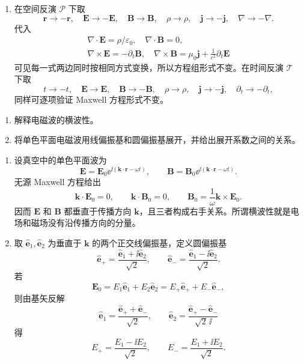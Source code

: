 \begin{question}
\begin{solution}
\begin{enumerate}
  \item 在空间反演 $\mathcal P$ 下取
  \[
    \mathbf r\to-\mathbf r,\quad
    \mathbf E\to-\mathbf E,
    \quad \mathbf B\to\mathbf B,
    \quad \rho\to\rho,
    \quad \mathbf j\to-\mathbf j,
    \quad \nabla\to-\nabla .
  \]
  代入
  \[
  \begin{gathered}
    \nabla\cdot\mathbf E=\rho/\varepsilon_0,
    \quad \nabla\cdot\mathbf B=0,\\
    \nabla\times\mathbf E=-\partial_t\mathbf B,
    \quad \nabla\times\mathbf B=\mu_0\mathbf j+\frac{1}{c^2}\partial_t\mathbf E
  \end{gathered}
  \]
  可见每一式两边同时按相同方式变换，所以方程组形式不变。在时间反演 $\mathcal T$ 下取
  \[
    t\to-t,
    \quad \mathbf E\to\mathbf E,
    \quad \mathbf B\to-\mathbf B,
    \quad \rho\to\rho,
    \quad \mathbf j\to-\mathbf j,
    \quad \partial_t\to-\partial_t,
  \]
  同样可逐项验证 Maxwell 方程形式不变。
\end{enumerate}
\end{solution}
\end{question}

\begin{question}[电磁波的横波性与偏振基]
\begin{enumerate}
  \item 解释电磁波的横波性。
  \item 将单色平面电磁波用线偏振基和圆偏振基展开，并给出展开系数之间的关系。
\end{enumerate}
\begin{solution}
\begin{enumerate}
  \item 设真空中的单色平面波为
  \[
    \mathbf E=\mathbf E_0\ee^{\ii(\mathbf k\cdot\mathbf r-\omega t)},
    \qquad
    \mathbf B=\mathbf B_0\ee^{\ii(\mathbf k\cdot\mathbf r-\omega t)} .
  \]
  无源 Maxwell 方程给出
  \[
    \mathbf k\cdot\mathbf E_0=0,
    \qquad
    \mathbf k\cdot\mathbf B_0=0,
    \qquad
    \mathbf B_0=\frac{1}{\omega}\mathbf k\times\mathbf E_0 .
  \]
  因而 $\mathbf E$ 和 $\mathbf B$ 都垂直于传播方向 $\mathbf k$，且三者构成右手关系。所谓横波性就是电场和磁场没有沿传播方向的分量。

  \item 取 $\hat{\mathbf e}_1,\hat{\mathbf e}_2$ 为垂直于 $\mathbf k$ 的两个正交线偏振基，定义圆偏振基
  \[
    \hat{\mathbf e}_+=\frac{\hat{\mathbf e}_1+\ii\hat{\mathbf e}_2}{\sqrt2},
    \qquad
    \hat{\mathbf e}_-=\frac{\hat{\mathbf e}_1-\ii\hat{\mathbf e}_2}{\sqrt2} .
  \]
  若
  \[
    \mathbf E_0=E_1\hat{\mathbf e}_1+E_2\hat{\mathbf e}_2
    =E_+\hat{\mathbf e}_+ + E_-\hat{\mathbf e}_- ,
  \]
  则由基矢反解
  \[
    \hat{\mathbf e}_1=\frac{\hat{\mathbf e}_++\hat{\mathbf e}_-}{\sqrt2},
    \qquad
    \hat{\mathbf e}_2=\frac{\hat{\mathbf e}_+-\hat{\mathbf e}_-}{\sqrt2\,\ii}
  \]
  得
  \[
    E_+=\frac{E_1-\ii E_2}{\sqrt2},
    \qquad
    E_-=\frac{E_1+\ii E_2}{\sqrt2} .
  \]
\end{enumerate}
\end{solution}
\end{question}

